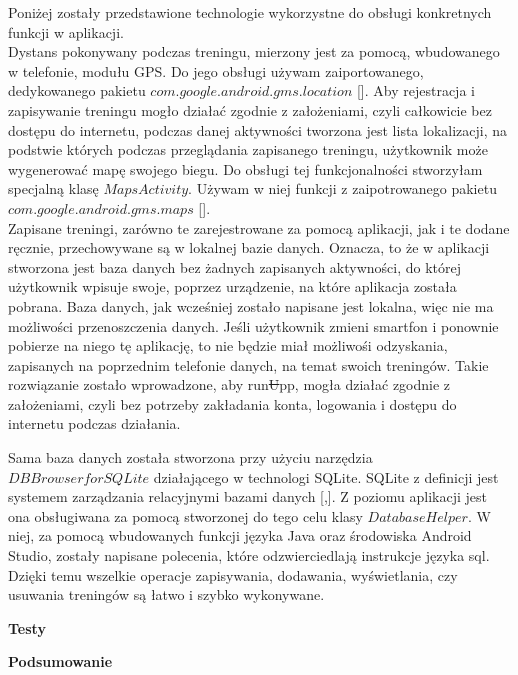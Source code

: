 \documentclass[a4paper,12pt,reqno]{article}
\begin{document}
Poniżej zostały przedstawione technologie wykorzystne do obsługi konkretnych funkcji w aplikacji.\\

Dystans pokonywany podczas treningu, mierzony jest za pomocą, wbudowanego w telefonie, modułu GPS. Do jego obsługi używam zaiportowanego, dedykowanego pakietu $com.google.android.gms.location$ []. Aby rejestracja i zapisywanie treningu mogło działać zgodnie z założeniami, czyli całkowicie bez dostępu do internetu, podczas danej aktywności tworzona jest lista lokalizacji, na podstwie których podczas przeglądania zapisanego treningu, użytkownik może wygenerować mapę swojego biegu. Do obsługi tej funkcjonalności stworzyłam specjalną klasę $MapsActivity$. Używam w niej funkcji z zaipotrowanego pakietu $com.google.android.gms.maps$ [].\\

Zapisane treningi, zarówno te zarejestrowane za pomocą aplikacji, jak i te dodane ręcznie, przechowywane są w lokalnej bazie danych. Oznacza, to że w aplikacji stworzona jest baza danych bez żadnych zapisanych aktywności, do której użytkownik wpisuje swoje, poprzez urządzenie, na które aplikacja została pobrana. Baza danych, jak wcześniej zostało napisane jest lokalna, więc nie ma możliwości przenoszczenia danych. Jeśli użytkownik zmieni smartfon i ponownie pobierze na niego tę aplikację, to nie będzie miał możliwośi odzyskania, zapisanych na poprzednim telefonie danych, na temat swoich treningów. Takie rozwiązanie zostało wprowadzone, aby run\sout{U}pp, mogła działać zgodnie z założeniami, czyli bez potrzeby zakładania konta, logowania i dostępu do internetu podczas działania.

Sama baza danych została stworzona przy użyciu narzędzia $DB Browser for SQLite$ działającego w technologi SQLite. SQLite z definicji jest systemem zarządzania relacyjnymi bazami danych [,]. Z poziomu aplikacji jest ona obsługiwana za pomocą stworzonej do tego celu klasy $DatabaseHelper$. W niej, za pomocą wbudowanych funkcji języka Java oraz środowiska Android Studio, zostały napisane polecenia, które odzwierciedlają instrukcje języka sql. Dzięki temu wszelkie operacje zapisywania, dodawania, wyświetlania, czy usuwania treningów są łatwo i szybko wykonywane.
\newpage

\begin{flushleft}
	\Large \textbf{Testy}
\end{flushleft}
\vspace{1cm}
\newpage

\begin{flushleft}
	\Large \textbf{Podsumowanie}
\end{flushleft}
\vspace{1cm}
\end{document}
